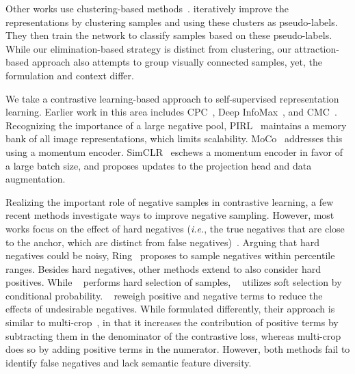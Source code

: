 \documentclass[10pt,twocolumn,letterpaper]{article}
\begin{document}
Other works use clustering-based methods~\cite{asano2020self, cliquecnn2016, 10.5555/3045390.3045442}. \citet{caron2018deep} iteratively improve the representations by clustering samples and using these clusters as pseudo-labels. They then train the network to classify samples based on these pseudo-labels. While our elimination-based strategy is distinct from clustering, our attraction-based approach also attempts to group visually connected samples, yet, the formulation and context differ.


We take a contrastive learning-based approach to self-supervised representation learning. Earlier work in this area includes CPC~\cite{oord2019representation, henaff2020dataefficient}, Deep InfoMax~\cite{hjelm2018learning,bachman2019learning}, and CMC~\cite{tian2020contrastive}. Recognizing the importance of a large negative pool, PIRL~\cite{misra2019selfsupervised} maintains a memory bank of all image representations, which limits scalability. MoCo~\cite{he2019moco} addresses this using a momentum encoder. SimCLR~\cite{chen2020simple} eschews a momentum encoder in favor of a large batch size, and proposes updates to the projection head and data augmentation.


Realizing the important role of negative samples in contrastive learning, a few recent methods investigate ways to improve negative sampling. However, most works focus on the effect of hard negatives (\emph{i.e.}, the true negatives that are close to the anchor, which are distinct from false negatives)~\cite{robinson2020contrastive, kalantidis2020hard}. Arguing that hard negatives could be noisy, Ring~\cite{wu2021conditional} proposes to sample negatives within percentile ranges. Besides hard negatives, other methods extend to also consider hard positives. While ~\cite{wang2020advances} performs hard selection of samples, ~\cite{zheng2021contrastive} utilizes soft selection by conditional probability.
~\citet{chuang2020debiased} reweigh positive and negative terms to reduce the effects of undesirable negatives. While formulated differently, their approach is similar to multi-crop~\cite{caron2020unsupervised}, in that it increases the contribution of positive terms by subtracting them in the denominator of the contrastive loss, whereas multi-crop does so by adding positive terms in the numerator. However, both methods fail to identify false negatives and lack semantic feature diversity. 
\end{document}
